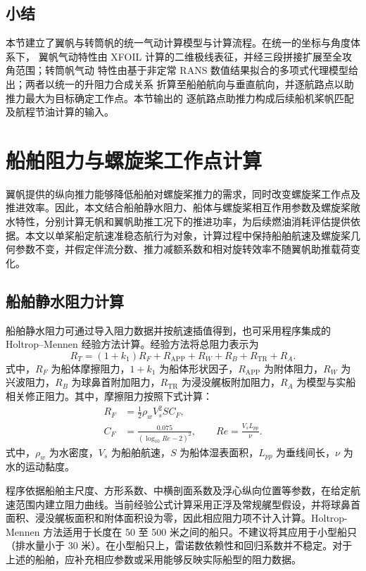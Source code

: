 \documentclass[UTF8,a4paper,twoside,zihao=5,fontset=windows]{ctexart}
\begin{document}
\subsection{小结}

本节建立了翼帆与转筒帆的统一气动计算模型与计算流程。在统一的坐标与角度体系下，
翼帆气动特性由 XFOIL 计算的二维极线表征，并经三段拼接扩展至全攻角范围；转筒帆气动
特性由基于非定常 RANS 数值结果拟合的多项式代理模型给出；两者以统一的升阻力合成关系
折算至船舶航向与垂直航向，并逐航路点以助推力最大为目标确定工作点。本节输出的
逐航路点助推力构成后续船机桨帆匹配及航程节油计算的输入。
\section{船舶阻力与螺旋桨工作点计算}
\label{sec:ship_propeller}
翼帆提供的纵向推力能够降低船舶对螺旋桨推力的需求，同时改变螺旋桨工作点及推进效率。因此，本文结合船舶静水阻力、船体与螺旋桨相互作用参数及螺旋桨敞水特性，分别计算无帆和翼帆助推工况下的推进功率，为后续燃油消耗评估提供依据。本文以单桨船定航速准稳态航行为对象，计算过程中保持船舶航速及螺旋桨几何参数不变，并假定伴流分数、推力减额系数和相对旋转效率不随翼帆助推载荷变化。

\subsection{船舶静水阻力计算}

船舶静水阻力可通过导入阻力数据并按航速插值得到，也可采用程序集成的 Holtrop--Mennen 经验方法计算。经验方法将总阻力表示为
\begin{equation}
R_T=(1+k_1)R_F+R_{\mathrm{APP}}+R_W+R_B+R_{\mathrm{TR}}+R_A.
\label{eq:resistance}
\end{equation}
式中，$R_F$ 为船体摩擦阻力，$1+k_1$ 为船体形状因子，$R_{\mathrm{APP}}$ 为附体阻力，$R_W$ 为兴波阻力，$R_B$ 为球鼻首附加阻力，$R_{\mathrm{TR}}$ 为浸没艉板附加阻力，$R_A$ 为模型与实船相关修正阻力。其中，摩擦阻力按照下式计算：
\begin{equation}
\begin{aligned}
R_F&=\frac{1}{2}\rho_w V_s^2 S C_F,\\
C_F&=\frac{0.075}{(\log_{10}Re-2)^2},\qquad Re=\frac{V_sL_{pp}}{\nu}.
\end{aligned}
\label{eq:friction}
\end{equation}
式中，$\rho_w$ 为水密度，$V_s$ 为船舶航速，$S$ 为船体湿表面积，$L_{pp}$ 为垂线间长，$\nu$ 为水的运动黏度。

程序依据船舶主尺度、方形系数、中横剖面系数及浮心纵向位置等参数，在给定航速范围内建立阻力曲线。当前经验公式计算采用正浮及常规艉型假设，并将球鼻首面积、浸没艉板面积和附体面积设为零，因此相应阻力项不计入计算。Holtrop-Mennen 方法适用于长度在 50 至 500 米之间的船只。不建议将其应用于小型船只（排水量小于 30 米）。在小型船只上，雷诺数依赖性和回归系数并不稳定。对于上述的船舶，应补充相应参数或采用能够反映实际船型的阻力数据。
\end{document}
